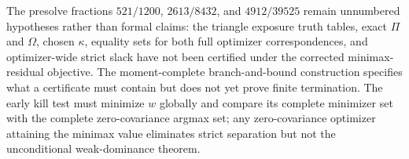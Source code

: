 The presolve fractions \(521/1200\), \(2613/8432\), and \(4912/39525\) remain unnumbered hypotheses rather than formal claims: the triangle exposure truth tables, exact \(\Pi\) and \(\Omega\), chosen \(\kappa\), equality sets for both full optimizer correspondences, and optimizer-wide strict slack have not been certified under the corrected minimax-residual objective.  The moment-complete branch-and-bound construction specifies what a certificate must contain but does not yet prove finite termination.  The early kill test must minimize \(w\) globally and compare its complete minimizer set with the complete zero-covariance argmax set; any zero-covariance optimizer attaining the minimax value eliminates strict separation but not the unconditional weak-dominance theorem.